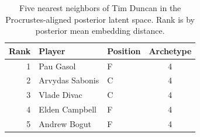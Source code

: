 \begin{table}[htbp]
  \centering\small
  \begin{tabular}{rllc}
    \toprule
    Rank & Player & Position & Archetype \\
    \midrule
    1 & Pau Gasol & F & 4 \\
    2 & Arvydas Sabonis & C & 4 \\
    3 & Vlade Divac & C & 4 \\
    4 & Elden Campbell & F & 4 \\
    5 & Andrew Bogut & F & 4 \\
    \bottomrule
  \end{tabular}
  \caption{Five nearest neighbors of Tim Duncan in the Procrustes-aligned posterior latent space. Rank is by posterior mean embedding distance.}
  \label{tab:Tim_Duncan_neighbors}
\end{table}

